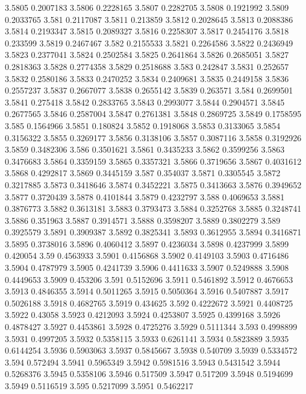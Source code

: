 3.5805  0.2007183
3.5806  0.2228165
3.5807  0.2282705
3.5808  0.1921992
3.5809  0.2033765
3.581  0.2117087
3.5811  0.213859
3.5812  0.2028645
3.5813  0.2088386
3.5814  0.2193347
3.5815  0.2089327
3.5816  0.2258307
3.5817  0.2454176
3.5818  0.233599
3.5819  0.2467467
3.582  0.2155533
3.5821  0.2264586
3.5822  0.2436949
3.5823  0.2377041
3.5824  0.2502584
3.5825  0.2641864
3.5826  0.2685051
3.5827  0.2818363
3.5828  0.2774358
3.5829  0.2518688
3.583  0.242847
3.5831  0.252657
3.5832  0.2580186
3.5833  0.2470252
3.5834  0.2409681
3.5835  0.2449158
3.5836  0.2557237
3.5837  0.2667077
3.5838  0.2655142
3.5839  0.263571
3.584  0.2699501
3.5841  0.275418
3.5842  0.2833765
3.5843  0.2993077
3.5844  0.2904571
3.5845  0.2677565
3.5846  0.2587004
3.5847  0.2761381
3.5848  0.2869725
3.5849  0.1758595
3.585  0.1564966
3.5851  0.180824
3.5852  0.1918068
3.5853  0.3133065
3.5854  0.3156322
3.5855  0.3269177
3.5856  0.3138106
3.5857  0.3087116
3.5858  0.3192926
3.5859  0.3482306
3.586  0.3501621
3.5861  0.3435233
3.5862  0.3599256
3.5863  0.3476683
3.5864  0.3359159
3.5865  0.3357321
3.5866  0.3719656
3.5867  0.4031612
3.5868  0.4292817
3.5869  0.3445159
3.587  0.354037
3.5871  0.3305545
3.5872  0.3217885
3.5873  0.3418646
3.5874  0.3452221
3.5875  0.3413663
3.5876  0.3949652
3.5877  0.3720439
3.5878  0.4101844
3.5879  0.4232797
3.588  0.4069653
3.5881  0.3876773
3.5882  0.3613181
3.5883  0.3793473
3.5884  0.3252768
3.5885  0.3248741
3.5886  0.351963
3.5887  0.3914571
3.5888  0.3598207
3.5889  0.3802279
3.589  0.3925579
3.5891  0.3909387
3.5892  0.3825341
3.5893  0.3612955
3.5894  0.3416871
3.5895  0.3738016
3.5896  0.4060412
3.5897  0.4236034
3.5898  0.4237999
3.5899  0.420054
3.59  0.4563933
3.5901  0.4156868
3.5902  0.4149103
3.5903  0.4716486
3.5904  0.4787979
3.5905  0.4241739
3.5906  0.4411633
3.5907  0.5249888
3.5908  0.4449653
3.5909  0.453206
3.591  0.5152696
3.5911  0.5461892
3.5912  0.4676653
3.5913  0.4846355
3.5914  0.5011265
3.5915  0.5050364
3.5916  0.5407887
3.5917  0.5026188
3.5918  0.4682765
3.5919  0.434625
3.592  0.4222672
3.5921  0.4408725
3.5922  0.43058
3.5923  0.4212093
3.5924  0.4253807
3.5925  0.4399168
3.5926  0.4878427
3.5927  0.4453861
3.5928  0.4725276
3.5929  0.5111344
3.593  0.4998899
3.5931  0.4997205
3.5932  0.5358115
3.5933  0.6261141
3.5934  0.5823889
3.5935  0.6144254
3.5936  0.5903063
3.5937  0.5845667
3.5938  0.540709
3.5939  0.5334572
3.594  0.572494
3.5941  0.5965349
3.5942  0.5981516
3.5943  0.5431542
3.5944  0.5268376
3.5945  0.5358106
3.5946  0.517509
3.5947  0.517209
3.5948  0.5194699
3.5949  0.5116519
3.595  0.5217099
3.5951  0.5462217
